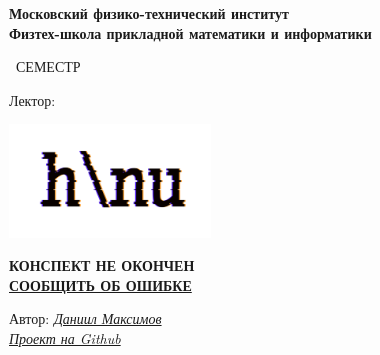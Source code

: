 \begin{titlepage}
	\clearpage\thispagestyle{empty}
	\centering
	
	\textbf{Московский физико-технический институт \\ Физтех-школа прикладной математики и информатики}
	\vspace{33ex}
	
	{\textbf{\FullCourseNameFirstPart}}
	
	\SemesterNumber\ СЕМЕСТР  
	\vspace{1ex}
	
	Лектор: \textit{\LecturerInitials}
	
	\includegraphics[width=0.4\textwidth]{images/logo_ltc.png}
	
	{\large \textbf{КОНСПЕКТ НЕ ОКОНЧЕН}
	\\
	\href{https://docs.google.com/forms/d/e/1FAIpQLSd9i-_jq_cDmIt65V_0G8eQYI1gfDlmH16T31zN7TnM2pk8jg/viewform?usp=sf_link}{\textbf{СООБЩИТЬ ОБ ОШИБКЕ}}}

	\begin{flushright}
		\noindent
		Автор: \href{https://vk.com/wolfawi}{\textit{Даниил Максимов}}
		\\
		\href{\GithubLink}{\textit{Проект на Github}}
	\end{flushright}
	
	\vfill
	\CourseDate
	\pagebreak
\end{titlepage}
